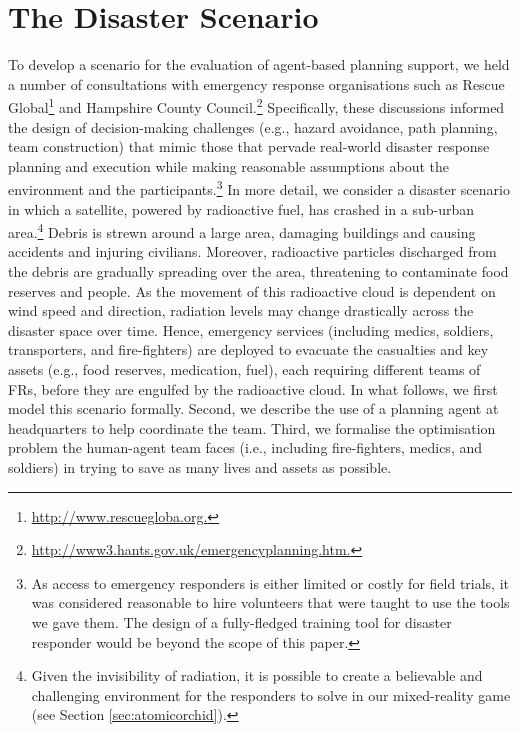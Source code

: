 \section{The Disaster Scenario}\label{sec:scenario}
\noindent To develop a scenario for the evaluation of agent-based planning support, we held a number of consultations with emergency response organisations such as Rescue Global\footnote{\url{http://www.rescuegloba.org.}} and Hampshire County Council.\footnote{\url{http://www3.hants.gov.uk/emergencyplanning.htm.}} Specifically,  these discussions informed the design of decision-making challenges  (e.g., hazard avoidance, path planning, team construction) that mimic those that pervade real-world disaster response planning and execution while making reasonable assumptions about the environment and the participants.\footnote{As access to emergency responders is either limited or costly for field trials, it was considered reasonable to hire volunteers that were taught to use the tools we gave them. The design of a fully-fledged training tool for disaster responder would be beyond the scope of this paper.}  In more detail, we consider a disaster scenario in which a satellite, powered by radioactive fuel,  has crashed in a sub-urban area.\footnote{Given the invisibility of radiation, it is possible to create a believable and challenging environment for the responders to solve in our mixed-reality game (see Section \ref{sec:atomicorchid}).} Debris is strewn around a large area, damaging buildings and causing accidents and injuring civilians. Moreover, radioactive particles discharged from the debris are gradually spreading over the area, threatening to contaminate food reserves and people. As the movement of this radioactive cloud is dependent on wind speed and direction, radiation levels may change drastically across the disaster space over time. Hence, emergency services (including medics, soldiers, transporters, and fire-fighters) are deployed to  evacuate the casualties and key assets (e.g., food reserves, medication, fuel), each requiring different teams of FRs, before they are engulfed by the radioactive cloud.  In what follows, we first model this scenario formally. Second, we describe the use of a planning agent at headquarters to help coordinate the team. Third, we formalise  the optimisation problem the human-agent team faces (i.e., including fire-fighters, medics, and soldiers) in trying to save as many lives and assets as possible.  


